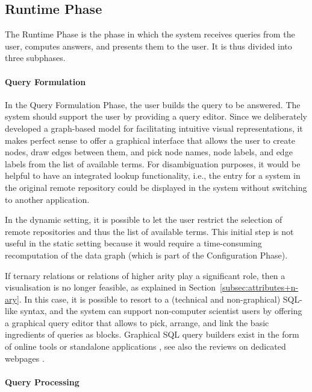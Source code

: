 \subsection{Runtime Phase}

The Runtime Phase is the phase in which the system receives queries from the user,
computes answers, and presents them to the user. It is thus divided into
three subphases.

\paragraph{Query Formulation}

In the Query Formulation Phase, the user builds the query
to be answered. The system should support the user by providing a query editor.
Since we deliberately developed a graph-based model
for facilitating intuitive visual representations,
it makes perfect sense to offer a graphical interface
that allows the user to create nodes, draw edges between them,
and pick node names, node labels, and edge labels from the list of available terms.
For disambiguation purposes, it would be helpful to have an
integrated lookup functionality, i.e., the entry for a system
in the original remote repository could be displayed in the system
without switching to another application.

In the dynamic setting, it is possible to let the user
restrict the selection of remote repositories and thus the list of available terms.
This initial step is not useful in the static setting
because it would require a time-consuming recomputation
of the data graph (which is part of the Configuration Phase).

If ternary relations or relations of higher arity play a significant role,
then a visualisation is no longer feasible, as explained in Section~\ref{subsec:attributes+n-ary}.
In this case, it is possible to resort to a (technical and non-graphical)
SQL-like syntax, and the system can support non-computer scientist users by 
offering a graphical query editor that allows to pick, arrange, and link
the basic ingredients of queries as blocks.
Graphical SQL query builders exist in the form of online tools or standalone applications
\autocite[e.g.,][]{VisualSQL,SQLeo}, see also the reviews on dedicated webpages
\autocite[e.g.,][]{ChartioVisualSQL,FinOnlBestVisualQueryBuilders}.

\paragraph{Query Processing}

